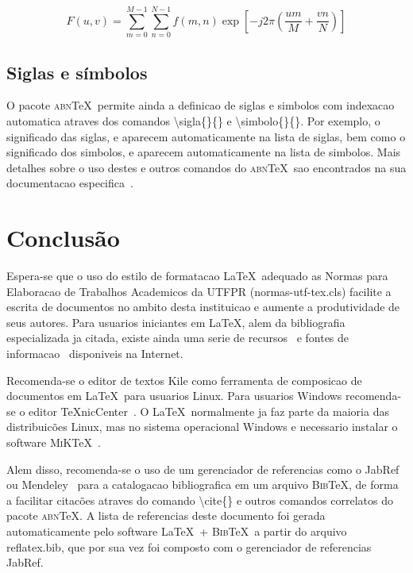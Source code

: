 \documentclass[openright]{normas-utf-tex} %
\begin{document}
\begin{equation}
F(u, v) = \sum_{m = 0}^{M - 1} \sum_{n = 0}^{N - 1} f(m, n) \exp \left[ -j 2 \pi \left( \frac{u m}{M} + \frac{v n}{N} \right) \right]
\label{eq:dft}
\end{equation}

\section{Siglas e símbolos}

O pacote \textsc{abn}\TeX\ permite ainda a definicao de siglas e simbolos com indexacao automatica atraves dos comandos {\ttfamily \textbackslash sigla\{\}\{\}} e {\ttfamily \textbackslash simbolo\{\}\{\}}. Por exemplo, o significado das siglas, e aparecem automaticamente na lista de siglas, bem como o significado dos simbolos, e aparecem automaticamente na lista de simbolos. Mais detalhes sobre o uso destes e outros comandos do \textsc{abn}\TeX\ sao encontrados na sua documentacao especifica~\cite{abnTeX2009}.


\chapter{Conclusão}

Espera-se que o uso do estilo de formatacao \LaTeX\ adequado as Normas para Elaboracao de Trabalhos Academicos da UTFPR ({\ttfamily normas-utf-tex.cls}) facilite a escrita de documentos no ambito desta instituicao e aumente a produtividade de seus autores. Para usuarios iniciantes em \LaTeX, alem da bibliografia especializada ja citada, existe ainda uma serie de recursos~\cite{CTAN2009} e fontes de informacao~\cite{TeX-Br2009,Wikibooks2009} disponiveis na Internet.

Recomenda-se o editor de textos Kile como ferramenta de composicao de documentos em \LaTeX\ para usuarios Linux. Para usuarios Windows recomenda-se o editor \TeX nicCenter~\cite{TeXnicCenter2009}. O \LaTeX\ normalmente ja faz parte da maioria das distribuic\~oes Linux, mas no sistema operacional Windows e necessario instalar o software \textsc{MiK}\TeX~\cite{MiKTeX2009}.

Alem disso, recomenda-se o uso de um gerenciador de referencias como o JabRef~\cite{JabRef2009} ou Mendeley~\cite{Mendeley2009} para a catalogacao bibliografica em um arquivo \textsc{Bib}\TeX, de forma a facilitar citac\~oes atraves do comando {\ttfamily \textbackslash cite\{\}} e outros comandos correlatos do pacote \textsc{abn}\TeX. A lista de referencias deste documento foi gerada automaticamente pelo software \LaTeX\ + \textsc{Bib}\TeX\ a partir do arquivo {\ttfamily reflatex.bib}, que por sua vez foi composto com o gerenciador de referencias JabRef.
\end{document}
